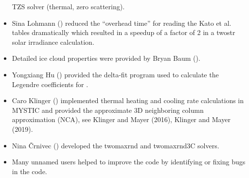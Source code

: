 \begin{itemize}
  TZS solver (thermal, zero scattering).
\item Sina Lohmann () reduced the ``overhead time''
  for reading the Kato et al. tables dramatically which resulted in 
  a speedup of a factor of 2 in a twostr solar irradiance calculation.
\item Detailed ice cloud properties were provided by Bryan Baum
  (). 
\item Yongxiang Hu () provided the delta-fit 
  program used to calculate the Legendre coefficients for .
\item Caro Klinger  () implemented
  thermal heating and cooling rate calculations in MYSTIC and provided the
  approximate 3D neighboring column approximation (NCA), see Klinger
  and Mayer (2016), Klinger and Mayer (2019).
\item Nina \v{C}rnivec  ()
  developed the twomaxrnd and twomaxrnd3C solvers.
\item Many unnamed users helped to improve the code by identifying 
  or fixing bugs in the code. 
\end{itemize}



